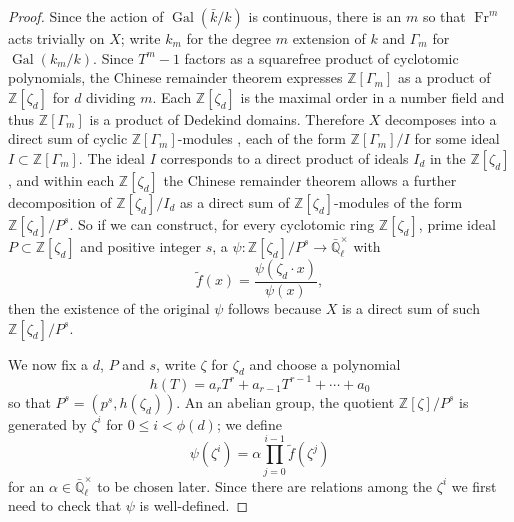 \documentclass[11pt]{amsart}
\theoremstyle{plain}
\theoremstyle{definition}
\theoremstyle{remark}
\newcommand{\ZZ}{{\mathbb{Z}}}
\newcommand{\EE}{\mathbb{\bar Q}_\ell}
\newcommand{\bFq}{\bar{k}}
\newcommand{\Fq}{k}
\newcommand{\Fqm}{k_m}
\DeclareMathOperator{\Gal}{Gal}
\newcommand{\Frob}{{\operatorname{Fr}}}
\begin{document}
\begin{proof}
Since the action of $\Gal(\bFq/\Fq)$ is continuous, there is an $m$ so that $\Frob^m$ acts trivially on $X$; write $\Fqm$ for the degree $m$ extension of $\Fq$ and $\Gamma_m$ for $\Gal(\Fqm/\Fq)$.  Since $T^m-1$ factors as a squarefree product of cyclotomic polynomials, the Chinese remainder theorem expresses $\ZZ[\Gamma_m]$ as a product of $\ZZ[\zeta_d]$ for $d$ dividing $m$.  Each $\ZZ[\zeta_d]$ is the maximal order in a number field and thus $\ZZ[\Gamma_m]$ is a product of Dedekind domains.  Therefore $X$ decomposes into a direct sum of cyclic $\ZZ[\Gamma_m]$-modules \cite[?]{Brandal}, each of the form $\ZZ[\Gamma_m] / I$ for some ideal $I \subset \ZZ[\Gamma_m]$.  The ideal $I$ corresponds to a direct product of ideals $I_d$ in the $\ZZ[\zeta_d]$, and within each $\ZZ[\zeta_d]$ the Chinese remainder theorem allows a further decomposition of $\ZZ[\zeta_d] / I_d$ as a direct sum of $\ZZ[\zeta_d]$-modules of the form $\ZZ[\zeta_d]/P^s$.  So if we can construct, for every cyclotomic ring $\ZZ[\zeta_d]$, prime ideal $P \subset \ZZ[\zeta_d]$ and positive integer $s$, a $\psi \colon \ZZ[\zeta_d]/P^s \rightarrow \EE^\times$ with
\begin{equation} \label{eq:psi-condition}
\tilde{f}(x) = \frac{\psi(\zeta_d \cdot x)}{\psi(x)},
\end{equation}
then the existence of the original $\psi$ follows because $X$ is a direct sum of such $\ZZ[\zeta_d]/P^s$.

We now fix a $d$, $P$ and $s$, write $\zeta$ for $\zeta_d$ and choose a polynomial
$$h(T) = a_rT^r + a_{r-1}T^{r-1} + \cdots + a_0$$
so that $P^s = (p^s, h(\zeta_d))$.
An an abelian group, the quotient $\ZZ[\zeta] / P^s$ is generated by $\zeta^i$ for $0 \le i < \phi(d)$; we define
\begin{equation} \label{eq:psi-def}
\psi(\zeta^i) = \alpha \prod_{j=0}^{i-1} \tilde{f}(\zeta^j)
\end{equation}
for an $\alpha \in \EE^\times$ to be chosen later.  Since there are relations among the $\zeta^i$ we first need to check that $\psi$ is well-defined.


\end{proof}
\end{document}
